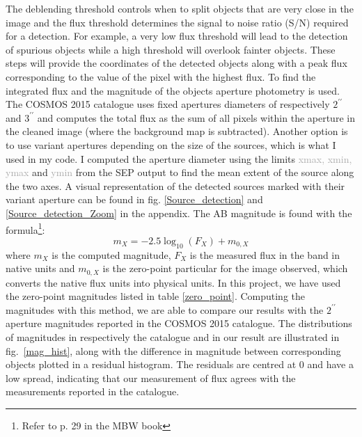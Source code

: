 The deblending threshold controls when to split objects that are very close in the image and the flux threshold determines the signal to noise ratio (S/N) required for a detection. For example, a very low flux threshold will lead to the detection of spurious objects while a high threshold will overlook fainter objects. These steps will provide the coordinates of the detected objects along with a peak flux corresponding  to the value of the pixel with the highest flux. To find the integrated flux and the magnitude of the objects aperture photometry is used. The COSMOS 2015 catalogue uses fixed apertures diameters of respectively $2^{\prime\prime}$ and $3^{\prime\prime}$ and computes the total flux as the sum of all pixels within the aperture in the cleaned image (where the background map is subtracted). Another option is to use variant apertures depending on the size of the sources, which is what I used in my code. I computed the aperture diameter using the limits \textcolor{darkgray}{xmax, xmin, ymax} and \textcolor{darkgray}{ymin} from the SEP output to find the mean extent of the source along the two axes. A visual representation of the detected sources marked with their variant aperture can be found in fig. \ref{Source_detection} and \ref{Source_detection_Zoom} in the appendix. The AB magnitude is found with the formula\footnote{Refer to p. 29 in the MBW book}:
\begin{equation}
    m_X = -2.5\log_{10}(F_X) + m_{0,X}
\end{equation}
where $m_X$ is the computed magnitude, $F_X$ is the measured flux in the band in native units and $m_{0,X}$ is the zero-point particular for the image observed, which converts the native flux units into physical units. In this project, we have used the zero-point magnitudes listed in table \ref{zero_point}. Computing the magnitudes with this method, we are able to compare our results with the $2^{\prime\prime}$ aperture magnitudes reported in the COSMOS 2015 catalogue. The distributions of magnitudes in respectively the catalogue and in our result are illustrated in fig.~\ref{mag_hist}, along with the difference in magnitude between corresponding objects plotted in a residual histogram. The residuals are centred at 0 and have a low spread, indicating that our measurement of flux agrees with the measurements reported in the catalogue.
